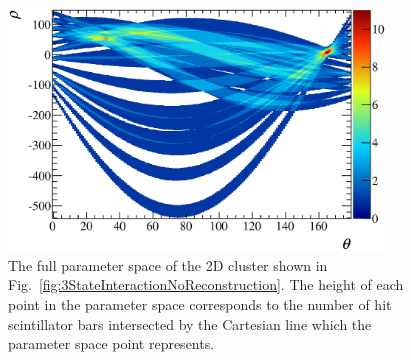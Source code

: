 \begin{figure}
  \centering
  \includegraphics[width=10cm]{images/ecal_hough_transform/FullParameterSpace_3StateInteraction.eps}
  \caption{The full parameter space of the 2D cluster shown in Fig.~\ref{fig:3StateInteractionNoReconstruction}.  The height of each point in the parameter space corresponds to the number of hit scintillator bars intersected by the Cartesian line which the parameter space point represents.}
  \label{fig:FullParameterSpace3StateInteraction}
\end{figure}


